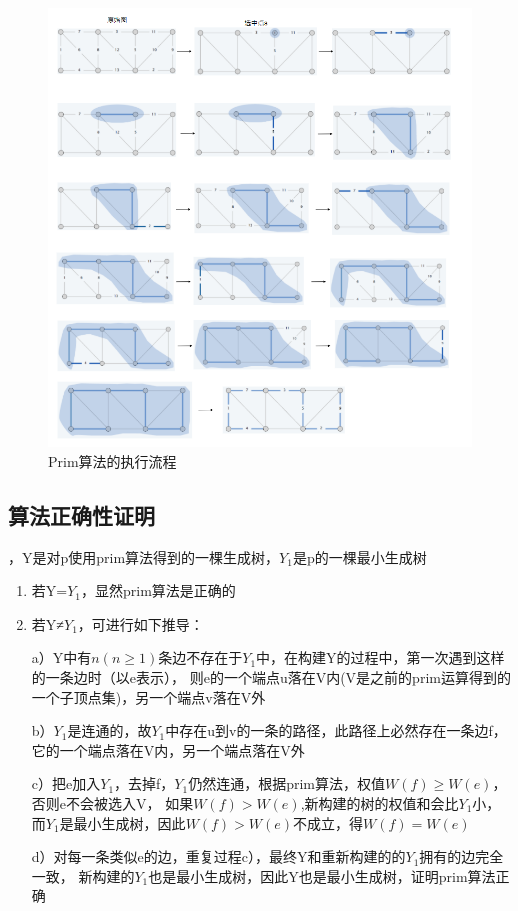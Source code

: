 \begin{figure}[hbt]
	\centering
	\includegraphics[scale=0.5]{image/prim.png}
	\caption{Prim算法的执行流程}\label{fig:Prim}
\end{figure}

\subsection{算法正确性证明}
，Y是对p使用prim算法得到的一棵生成树，$Y_1$是p的一棵最小生成树
\begin{enumerate}
	\item 若Y=$Y_1$，显然prim算法是正确的
	\item 若Y≠$Y_1$，可进行如下推导：

	a）Y中有$n( n \geq 1 )$条边不存在于$Y_1$中，在构建Y的过程中，第一次遇到这样的一条边时（以e表示），
	则e的一个端点u落在V内(V是之前的prim运算得到的一个子顶点集)，另一个端点v落在V外
	
	b）$Y_1$是连通的，故$Y_1$中存在u到v的一条的路径，此路径上必然存在一条边f，它的一个端点落在V内，另一个端点落在V外
	
	c）把e加入$Y_1$，去掉f，$Y_1$仍然连通，根据prim算法，权值$W(f) \geq W(e)$，否则e不会被选入V，
	如果$W(f)>W(e)$,新构建的树的权值和会比$Y_1$小，而$Y_1$是最小生成树，因此$W(f)>W(e)$不成立，得$W(f)=W(e)$
	
	d）对每一条类似e的边，重复过程c），最终Y和重新构建的的$Y_1$拥有的边完全一致，
	新构建的$Y_1$也是最小生成树，因此Y也是最小生成树，证明prim算法正确
\end{enumerate}

